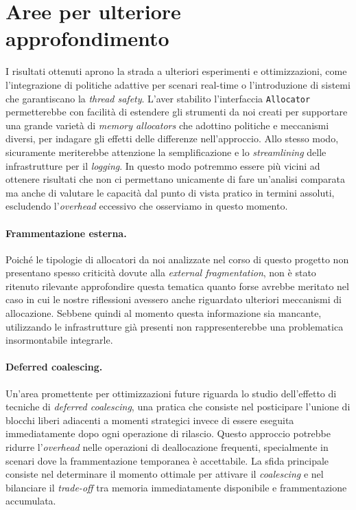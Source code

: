 \section{Aree per ulteriore approfondimento}

I risultati ottenuti aprono la strada a ulteriori esperimenti e ottimizzazioni, come l’integrazione di politiche adattive per scenari real-time o l'introduzione di sistemi che garantiscano la \textit{thread safety}. L'aver stabilito l'interfaccia \texttt{Allocator} permetterebbe con facilità di estendere gli strumenti da noi creati per supportare una grande varietà di \textit{memory allocators} che adottino politiche e meccanismi diversi, per indagare gli effetti delle differenze nell'approccio. Allo stesso modo, sicuramente meriterebbe attenzione la semplificazione e lo \textit{streamlining} delle infrastrutture per il \textit{logging}. In questo modo potremmo essere più vicini ad ottenere risultati che non ci permettano unicamente di fare un'analisi comparata ma anche di valutare le capacità dal punto di vista pratico in termini assoluti, escludendo l'\textit{overhead} eccessivo che osserviamo in questo momento.

\paragraph{Frammentazione esterna.}
Poiché le tipologie di allocatori da noi analizzate nel corso di questo progetto non presentano spesso criticità dovute alla \textit{external fragmentation}, non è stato ritenuto rilevante approfondire questa tematica quanto forse avrebbe meritato nel caso in cui le nostre riflessioni avessero anche riguardato ulteriori meccanismi di allocazione. Sebbene quindi al momento questa informazione sia mancante, utilizzando le infrastrutture già presenti non rappresenterebbe una problematica insormontabile integrarle.

\paragraph{Deferred coalescing.}
Un'area promettente per ottimizzazioni future riguarda lo studio dell'effetto di tecniche di \textit{deferred coalescing}, una pratica che consiste nel posticipare l'unione di blocchi liberi adiacenti a momenti strategici invece di essere eseguita immediatamente dopo ogni operazione di rilascio. Questo approccio potrebbe ridurre l'\textit{overhead} nelle operazioni di deallocazione frequenti, specialmente in scenari dove la frammentazione temporanea è accettabile. La sfida principale consiste nel determinare il momento ottimale per attivare il \textit{coalescing} e nel bilanciare il \textit{trade-off} tra memoria immediatamente disponibile e frammentazione accumulata.


